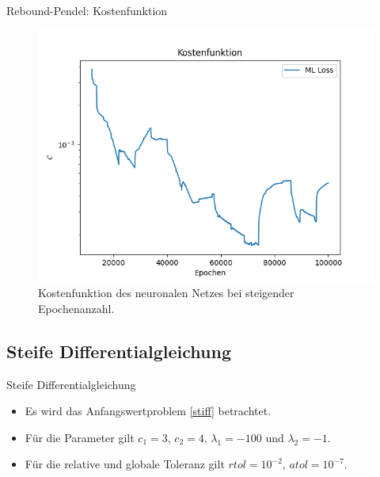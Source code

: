\begin{frame}{Rebound-Pendel: Kostenfunktion}
    \begin{figure}
        \centering
        \includegraphics[scale=0.5]{images/Rebound_plots/reboundpendulumavr_loss}
        \caption{Kostenfunktion des neuronalen Netzes bei steigender Epochenanzahl.}
        \label{fig:rebound-loss}
    \end{figure}
\end{frame}


\subsection{Steife Differentialgleichung}

\begin{frame}{Steife Differentialgleichung}
    \begin{itemize}
        \item<1-> Es wird das Anfangswertproblem \eqref{stiff} betrachtet.
        \item<2-> Für die Parameter gilt $c_1=3$, $c_2=4$, $\lambda_1=-100$ und $\lambda_2=-1$.
        \item<3-> Für die relative und globale Toleranz gilt $rtol=10^{-2}$, $atol=10^{-7}$.
    \end{itemize}
\end{frame}

